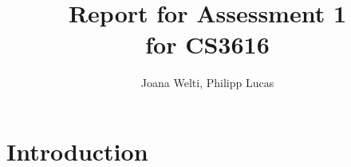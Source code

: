 \documentclass[a4paper,10pt]{scrartcl}
\title{Report for Assessment 1 \\ \large{for CS3616}}
\author{Joana Welti, Philipp Lucas}
\begin{document}
\maketitle
\newpage

\tableofcontents

\newpage

\section{Introduction}
\end{document}
